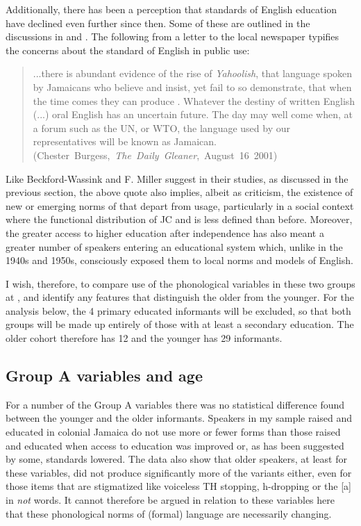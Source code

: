   Additionally, there has been a perception that standards of English education have declined even further since then.  Some of these are outlined in the discussions in \citet[60]{Patrick1999} and \citet{Christie2003}.  The following from a letter to the local newspaper typifies the concerns about the standard of English in public use:\largerpage[1]

\begin{quote} ...there is abundant evidence of the rise of \textit{Yahoolish}, that language spoken by Jamaicans who believe and insist, yet fail to so demonstrate, that when the time comes they can produce .  Whatever the destiny of written English (...) oral English has an uncertain future.  The day may well come when, at a forum such as the UN, or WTO, the language used by our representatives will be known as Jamaican.\\\hbox{}\hfill\hbox{(Chester Burgess, \textit{The Daily Gleaner}, August 16 2001)}\end{quote}

Like Beckford-Wassink and F. Miller suggest in their studies, as discussed in the previous section, the above quote also implies, albeit as criticism, the existence of new or emerging norms of  that depart from  usage, particularly in a social context where the functional distribution of JC and  is less defined than before.  Moreover, the greater access to higher education after independence has also meant a greater number of speakers entering an educational system which, unlike in the 1940s and 1950s, consciously exposed them to local norms and models of English.  

I wish, therefore, to compare use of the phonological variables in these two  groups at , and identify any features that distinguish the older from the younger.  For the analysis below, the 4 primary educated informants will be excluded, so that both groups will be made up entirely of those with at least a secondary education.  The older  cohort therefore has 12 and the younger has 29 informants. 

\subsection{Group A variables and age}%

  For a number of the Group A variables there was no statistical difference found between the younger and the older informants.  Speakers in my sample raised and educated in colonial Jamaica do not use more or fewer  forms than those raised and educated when access to education was improved or, as has been suggested by some, standards lowered.  The data also show that older speakers, at least for these variables, did not produce significantly more of the  variants either, even for those items that are stigmatized like voiceless TH stopping, h-dropping or the  [a] in \textit{not} words.  It cannot therefore be argued in relation to these variables here that these phonological norms of (formal) language are necessarily changing.      


